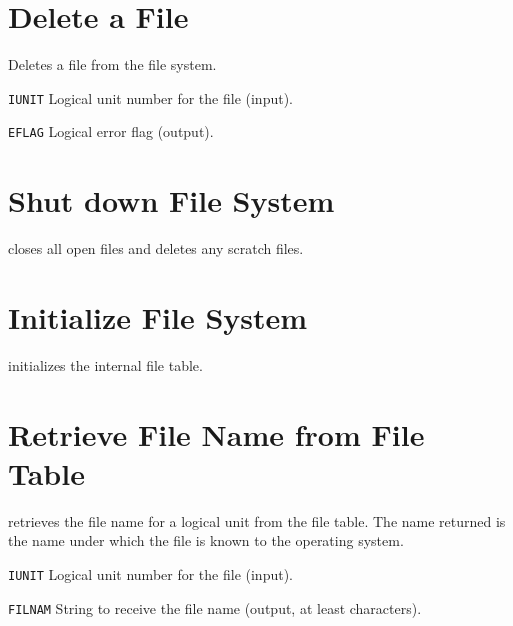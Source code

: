 \section{Delete a File}
\label{FLDELE}
Deletes a file from the file system.
\begin{mylist}
\item[\tt IUNIT]
Logical unit number for the file (input).
\item[\tt EFLAG]
Logical error flag (output).
\end{mylist}

\section{Shut down File System}
\label{FLEND}
closes all open files and deletes any scratch files.

\section{Initialize File System}
\label{FLINIT}
initializes the internal file table.

\section{Retrieve File Name from File Table}
\label{FLNAME}
retrieves the file name for a logical unit from the file table.
The name returned is the name under which the file is known to the
operating system.
\begin{mylist}
\item[\tt IUNIT]
Logical unit number for the file (input).
\item[\tt FILNAM]
String to receive the file name
(output, at least  characters).
\end{mylist}

